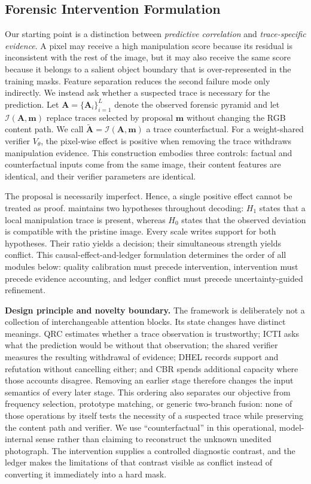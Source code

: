 \subsection{Forensic Intervention Formulation}
\label{sec:formulation}

Our starting point is a distinction between \emph{predictive correlation} and
\emph{trace-specific evidence}. A pixel may receive a high manipulation score
because its residual is inconsistent with the rest of the image, but it may also
receive the same score because it belongs to a salient object boundary that is
over-represented in the training masks. Feature separation reduces the second
failure mode only indirectly. We instead ask whether a suspected trace is
necessary for the prediction. Let $\mathbf A=\{\mathbf A_i\}_{i=1}^L$ denote the
observed forensic pyramid and let $\mathcal I(\mathbf A,\mathbf m)$ replace traces
selected by proposal $\mathbf m$ without changing the RGB content path. We call
$\widetilde{\mathbf A}=\mathcal I(\mathbf A,\mathbf m)$ a trace counterfactual.
For a weight-shared verifier $V_\theta$, the pixel-wise effect is positive when
removing the trace withdraws manipulation evidence. This construction embodies
three controls: factual and counterfactual inputs come from the same image, their
content features are identical, and their verifier parameters are identical.

The proposal is necessarily imperfect. Hence, a single positive effect cannot be
treated as proof. \method{} maintains two hypotheses throughout decoding:
$H_1$ states that a local manipulation trace is present, whereas $H_0$ states that
the observed deviation is compatible with the pristine image. Every scale writes
support for both hypotheses. Their ratio yields a decision; their simultaneous
strength yields conflict. This causal-effect-and-ledger formulation determines
the order of all modules below: quality calibration must precede intervention,
intervention must precede evidence accounting, and ledger conflict must precede
uncertainty-guided refinement.

\textbf{Design principle and novelty boundary.}
The framework is deliberately not a collection of interchangeable attention
blocks. Its state changes have distinct meanings. QRC estimates whether a trace
observation is trustworthy; ICTI asks what the prediction would be without that
observation; the shared verifier measures the resulting withdrawal of evidence;
DHEL records support and refutation without cancelling either; and CBR spends
additional capacity where those accounts disagree. Removing an earlier stage
therefore changes the input semantics of every later stage. This ordering also
separates our objective from frequency selection, prototype matching, or generic
two-branch fusion: none of those operations by itself tests the necessity of a
suspected trace while preserving the content path and verifier. We use
``counterfactual'' in this operational, model-internal sense rather than claiming
to reconstruct the unknown unedited photograph. The intervention supplies a
controlled diagnostic contrast, and the ledger makes the limitations of that
contrast visible as conflict instead of converting it immediately into a hard
mask.

